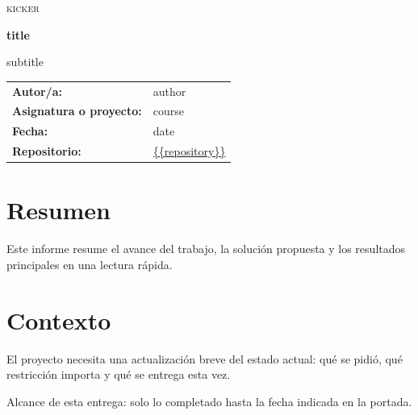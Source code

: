 \documentclass[11pt,a4paper]{article}
\begin{document}
  \begin{titlepage}
    \centering
    {\scshape\large {{kicker}} \par}
    \vspace{1.0cm}
    {\huge\bfseries {{title}} \par}
    \vspace{0.4cm}
    {\Large {{subtitle}} \par}
    \vspace{1.4cm}
    \begin{tcolorbox}[colback=acento!4, colframe=acento!45!black, width=0.88\textwidth]
      \begin{tabular}{@{}ll@{}}
        \textbf{Autor/a:} & {{author}} \\
        \textbf{Asignatura o proyecto:} & {{course}} \\
        \textbf{Fecha:} & {{date}} \\
        \textbf{Repositorio:} & {\small\url{{{repository}}}} \\
      \end{tabular}
    \end{tcolorbox}
    \vfill
  \end{titlepage}

  \section{Resumen}
  \begin{clave}
    Este informe resume el avance del trabajo, la solución propuesta y los
    resultados principales en una lectura rápida.
  \end{clave}

  \section{Contexto}
  El proyecto necesita una actualización breve del estado actual: qué se pidió,
  qué restricción importa y qué se entrega esta vez.
  \begin{nota}
    Alcance de esta entrega: solo lo completado hasta la fecha indicada en la portada.
  \end{nota}
\end{document}
